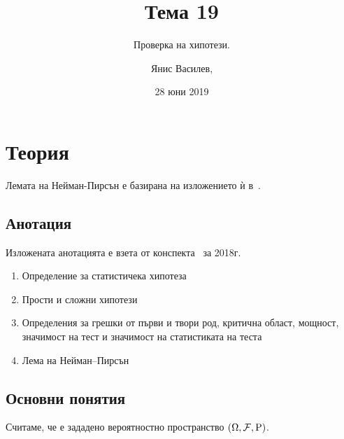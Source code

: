 \documentclass[numbers=endperiod, bibliography=totocnumbered]{scrartcl}
\title{Тема 19}
\subtitle{Проверка на хипотези.}
\author{Янис Василев, \Email{ianis@ivasilev.net}}
\date{28 юни 2019}
\begin{document}
\maketitle

\section{Теория}

Лемата на Нейман-Пирсън е базирана на изложението ѝ в~\cite{DimitrovYanev}.

\subsection{Анотация}

Изложената анотацията е взета от конспекта~\cite{Syllabus} за 2018г.

\begin{enumerate}
  \item Определение за статистичека хипотеза
  \item Прости и сложни хипотези
  \item Определения за грешки от първи и твори род, критична област, мощност, значимост на тест и значимост на статистиката на теста
  \item Лема на Нейман–Пирсън
\end{enumerate}

\subsection{Основни понятия}

Считаме, че е зададено вероятностно пространство \( (\Omega, \mathcal{F}, \operatorname{P}) \).
\end{document}
